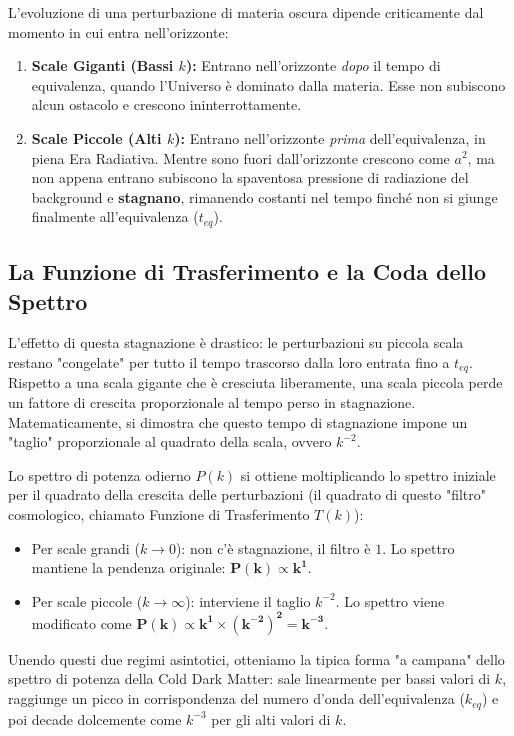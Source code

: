 \documentclass[11pt,a4paper]{report}
\begin{document}
L'evoluzione di una perturbazione di materia oscura dipende criticamente dal momento in cui entra nell'orizzonte:
\begin{enumerate}
    \item \textbf{Scale Giganti (Bassi $k$):} Entrano nell'orizzonte \textit{dopo} il tempo di equivalenza, quando l'Universo è dominato dalla materia. Esse non subiscono alcun ostacolo e crescono ininterrottamente.
    \item \textbf{Scale Piccole (Alti $k$):} Entrano nell'orizzonte \textit{prima} dell'equivalenza, in piena Era Radiativa. Mentre sono fuori dall'orizzonte crescono come $a^2$, ma non appena entrano subiscono la spaventosa pressione di radiazione del background e \textbf{stagnano}, rimanendo costanti nel tempo finché non si giunge finalmente all'equivalenza ($t_{eq}$).
\end{enumerate}

\subsection{La Funzione di Trasferimento e la Coda dello Spettro}
L'effetto di questa stagnazione è drastico: le perturbazioni su piccola scala restano "congelate" per tutto il tempo trascorso dalla loro entrata fino a $t_{eq}$. Rispetto a una scala gigante che è cresciuta liberamente, una scala piccola perde un fattore di crescita proporzionale al tempo perso in stagnazione. 
Matematicamente, si dimostra che questo tempo di stagnazione impone un "taglio" proporzionale al quadrato della scala, ovvero $k^{-2}$.

Lo spettro di potenza odierno $P(k)$ si ottiene moltiplicando lo spettro iniziale per il quadrato della crescita delle perturbazioni (il quadrato di questo "filtro" cosmologico, chiamato Funzione di Trasferimento $T(k)$):
\begin{itemize}
    \item Per scale grandi ($k \to 0$): non c'è stagnazione, il filtro è $1$. Lo spettro mantiene la pendenza originale: $\mathbf{P(k) \propto k^1}$.
    \item Per scale piccole ($k \to \infty$): interviene il taglio $k^{-2}$. Lo spettro viene modificato come $\mathbf{P(k) \propto k^1 \times (k^{-2})^2 = k^{-3}}$.
\end{itemize}
Unendo questi due regimi asintotici, otteniamo la tipica forma "a campana" dello spettro di potenza della Cold Dark Matter: sale linearmente per bassi valori di $k$, raggiunge un picco in corrispondenza del numero d'onda dell'equivalenza ($k_{eq}$) e poi decade dolcemente come $k^{-3}$ per gli alti valori di $k$.
\end{document}
